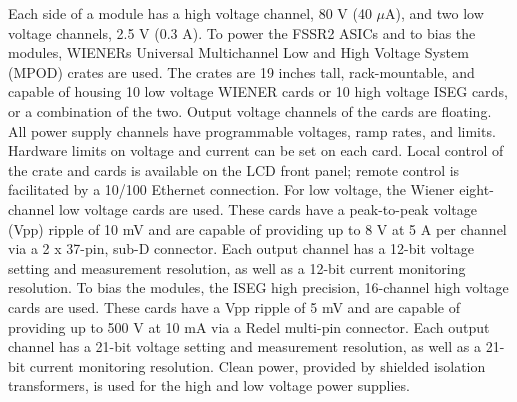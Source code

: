 Each side of a module has a high voltage channel, 80 V (40 $\mu$A), and two low voltage channels, 2.5 V (0.3 A). To power the FSSR2 ASICs and to bias the modules, WIENERs Universal Multichannel Low and High Voltage System (MPOD) crates are used. The crates are 19 inches tall, rack-mountable, and capable of housing 10 low voltage WIENER cards or 10 high voltage ISEG cards, or a combination of the two. Output voltage channels of the cards are floating. All power supply channels have programmable voltages, ramp rates, and limits. Hardware limits on voltage and current can be set on each card. Local control of the crate and cards is available on the LCD front panel; remote control is facilitated by a 10/100 Ethernet connection.
For low voltage, the Wiener eight-channel low voltage cards are used. These cards have a peak-to-peak voltage
(Vpp) ripple of 10 mV and are capable of providing up to 8 V at 5 A per channel via a 2 x 37-pin, sub-D connector.
Each output channel has a 12-bit voltage setting and measurement resolution, as well as a 12-bit current monitoring
resolution.
To bias the modules, the ISEG high precision, 16-channel high voltage cards are used. These cards have a Vpp
ripple of 5 mV and are capable of providing up to 500 V at 10 mA via a Redel multi-pin connector. Each output channel
has a 21-bit voltage setting and measurement resolution, as well as a 21-bit current monitoring resolution. Clean
power, provided by shielded isolation transformers, is used for the high and low voltage power supplies.

